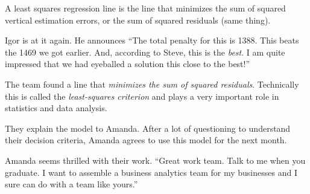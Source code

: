 \documentclass[
  12pt,
  letterpaper,
  DIV=11,
  numbers=noendperiod]{scrreprt}
\begin{document}
\begin{tcolorbox}[enhanced jigsaw, colback=white, leftrule=.75mm, toprule=.15mm, bottomtitle=1mm, breakable, coltitle=black, toptitle=1mm, title=\textcolor{quarto-callout-note-color}{\faInfo}\hspace{0.5em}{Answer}, opacitybacktitle=0.6, colbacktitle=quarto-callout-note-color!10!white, arc=.35mm, left=2mm, colframe=quarto-callout-note-color-frame, titlerule=0mm, rightrule=.15mm, bottomrule=.15mm, opacityback=0]

A least squares regression line is the line that minimizes the sum of
squared vertical estimation errors, or the sum of squared residuals
(same thing).

\end{tcolorbox}

Igor is at it again. He announces ``The total penalty for this is 1388.
This beats the 1469 we got earlier. And, according to Steve, this is the
\emph{best}. I am quite impressed that we had eyeballed a solution this
close to the best!''

\begin{tcolorbox}[enhanced jigsaw, colback=white, leftrule=.75mm, toprule=.15mm, bottomtitle=1mm, breakable, coltitle=black, toptitle=1mm, title=\textcolor{quarto-callout-important-color}{\faExclamation}\hspace{0.5em}{Important}, opacitybacktitle=0.6, colbacktitle=quarto-callout-important-color!10!white, arc=.35mm, left=2mm, colframe=quarto-callout-important-color-frame, titlerule=0mm, rightrule=.15mm, bottomrule=.15mm, opacityback=0]

The team found a line that \emph{minimizes the sum of squared
residuals}. Technically this is called the \emph{least-squares
criterion} and plays a very important role in statistics and data
analysis.

\end{tcolorbox}

They explain the model to Amanda. After a lot of questioning to
understand their decision criteria, Amanda agrees to use this model for
the next month.

Amanda seems thrilled with their work. ``Great work team. Talk to me
when you graduate. I want to assemble a business analytics team for my
businesses and I sure can do with a team like yours.''
\end{document}
